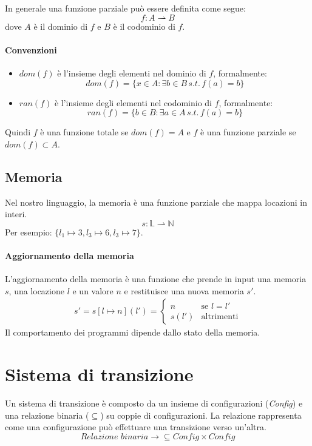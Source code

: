 In generale una funzione parziale può essere definita come segue:
\[
  f : A \rightharpoonup  B
\]
dove $A$ è il dominio di $f$ e $B$ è il codominio di $f$.
\paragraph{Convenzioni}
\begin{itemize}
  \item $dom(f)$ è l'insieme degli elementi nel dominio di $f$, formalmente:
  \[
    dom(f) = \{x \in A : \exists b \in B \,s.t.\, f(a) = b\}
  \]
  \item $ran(f)$ è l'insieme degli elementi nel codominio di $f$, formalmente:
  \[
    ran(f) = \{b \in B : \exists a \in A \,s.t.\, f(a) = b\}
  \]
\end{itemize}
Quindi $f$ è una funzione totale se $dom(f) = A$ e $f$ è una funzione parziale
se $dom(f) \subset A$.
\subsection{Memoria}
Nel nostro linguaggio, la memoria è una funzione parziale che mappa locazioni
in interi. 
\[
  s : \mathbb{L} \rightharpoonup \mathbb{N}
\]
Per esempio: $\{l_1 \mapsto 3, l_3 \mapsto 6, l_3 \mapsto 7 \}$.
\paragraph{Aggiornamento della memoria}
L'aggiornamento della memoria è una funzione che prende in input una memoria
$s$, una locazione $l$ e un valore $n$ e restituisce una nuova memoria $s'$.
\begin{align*}
  s' = s[l \mapsto n](l') =
  \begin{cases}
    n & \text{se } l = l' \\
    s(l') & \text{altrimenti}
    \end{cases}
\end{align*}
Il comportamento dei programmi dipende dallo stato della memoria. 
\section{Sistema di transizione}
Un sistema di transizione è composto da un insieme di
configurazioni (\textit{Config}) e una relazione binaria (\(\subseteq\)) su coppie
di configurazioni. La relazione rappresenta come una configurazione può effettuare
una transizione verso un'altra.
\[
  \textit{Relazione binaria} \rightarrow \subseteq \textit{Config} \times \textit{Config}
\]

